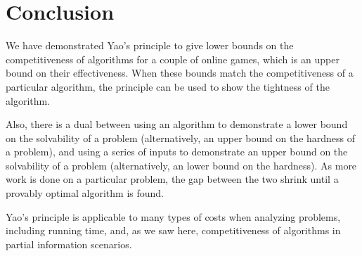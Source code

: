 \section{Conclusion}
We have demonstrated Yao's principle to give lower bounds on the competitiveness of algorithms for a couple of online games, which is an upper bound on their effectiveness. When these bounds match the competitiveness of a particular algorithm, the principle can be used to show the tightness of the algorithm.

Also, there is a dual between using an algorithm to demonstrate a lower bound on the solvability of a problem (alternatively, an upper bound on the hardness of a problem), and using a series of inputs to demonstrate an upper bound on the solvability of a problem (alternatively, an lower bound on the hardness). As more work is done on a particular problem, the gap between the two shrink until a provably optimal algorithm is found.

Yao's principle is applicable to many types of costs when analyzing problems, including running time, and, as we saw here, competitiveness of algorithms in partial information scenarios.
